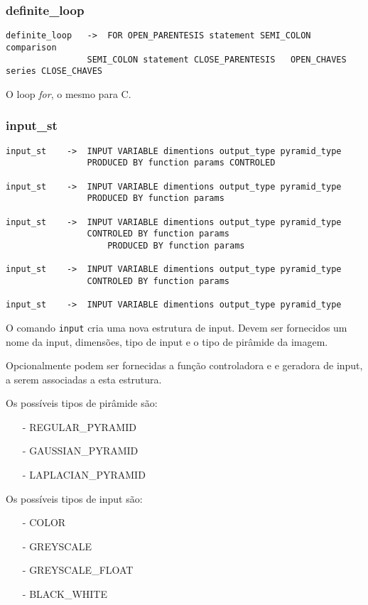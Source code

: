 \documentclass[a4paper,10pt]{article}
\begin{document}
	\subsubsection{definite\_loop}
		\begin{lstlisting}
definite_loop	->	FOR OPEN_PARENTESIS statement SEMI_COLON comparison 
				SEMI_COLON statement CLOSE_PARENTESIS 	OPEN_CHAVES series CLOSE_CHAVES
		\end{lstlisting}
O loop \textit{for}, o mesmo para C.\newline
\vspace{10mm}

	\subsubsection{input\_st}
		\begin{lstlisting}	
input_st	->	INPUT VARIABLE dimentions output_type pyramid_type 
				PRODUCED BY function params CONTROLED
				
input_st	->	INPUT VARIABLE dimentions output_type pyramid_type
				PRODUCED BY function params

input_st	->	INPUT VARIABLE dimentions output_type pyramid_type
				CONTROLED BY function params
					PRODUCED BY function params
				
input_st	->	INPUT VARIABLE dimentions output_type pyramid_type
				CONTROLED BY function params

input_st	->	INPUT VARIABLE dimentions output_type pyramid_type
		\end{lstlisting}
O comando \texttt{input} cria uma nova estrutura de input. Devem ser fornecidos um nome da input, dimens\~{o}es, tipo de input e o tipo de pir\^{a}mide da imagem.

Opcionalmente podem ser fornecidas a fun\c{c}\~ao controladora e e geradora de input, a serem associadas a esta estrutura.


Os poss\'iveis tipos de pir\^amide s\~ao:
	\begin{enumerate}
	 \item[-] REGULAR\_PYRAMID
	 \item[-] GAUSSIAN\_PYRAMID
	 \item[-] LAPLACIAN\_PYRAMID
	\end{enumerate}


Os poss\'iveis tipos de input s\~ao:
	\begin{enumerate}
	 \item[-] COLOR
	 \item[-] GREYSCALE
	 \item[-] GREYSCALE\_FLOAT
	 \item[-] BLACK\_WHITE
	\end{enumerate}
\end{document}
